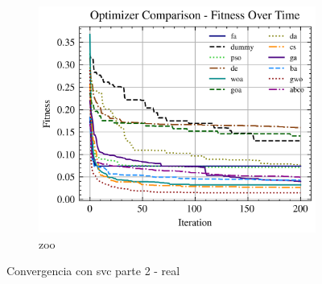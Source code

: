 \begin{figure}[htp]
\begin{subfigure}[htp]{0.45\textwidth}
        \includegraphics[width=\textwidth]{imagenes/fitness_charts/img/real/zoo/optimizers_fitness_svc.png}
        \caption{zoo}
    \end{subfigure}
    \caption{Convergencia con svc parte 2 - real}
    \label{fig:convergencia_svc_2_real}
\end{figure}

